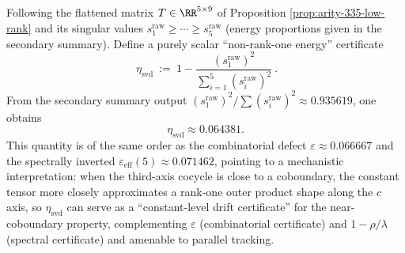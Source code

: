 \begin{remark}\label{rem:arity-335-eta-svd}
Following the flattened matrix \(T\in\RR^{5\times 9}\) of Proposition \ref{prop:arity-335-low-rank} and its singular values \(s_1^{\mathrm{raw}}\ge\cdots\ge s_5^{\mathrm{raw}}\) (energy proportions given in the secondary summary).
Define a purely scalar ``non-rank-one energy'' certificate
$$
\boxed{\
\eta_{\mathrm{svd}}
\ :=\
1-\frac{(s_1^{\mathrm{raw}})^2}{\sum_{i=1}^5 (s_i^{\mathrm{raw}})^2}\ }.
$$
From the secondary summary output
\(
(s_1^{\mathrm{raw}})^2/\sum (s_i^{\mathrm{raw}})^2\approx 0.935619
\),
one obtains
$$
\eta_{\mathrm{svd}}\approx 0.064381.
$$
This quantity is of the same order as the combinatorial defect \(\varepsilon\approx 0.066667\) and the spectrally inverted \(\varepsilon_{\mathrm{eff}}(5)\approx 0.071462\), pointing to a mechanistic interpretation:
when the third-axis cocycle is close to a coboundary, the constant tensor more closely approximates a rank-one outer product shape along the \(c\) axis, so \(\eta_{\mathrm{svd}}\) can serve as a ``constant-level drift certificate'' for the near-coboundary property, complementing \(\varepsilon\) (combinatorial certificate) and \(1-\rho/\lambda\) (spectral certificate) and amenable to parallel tracking.
\end{remark}
